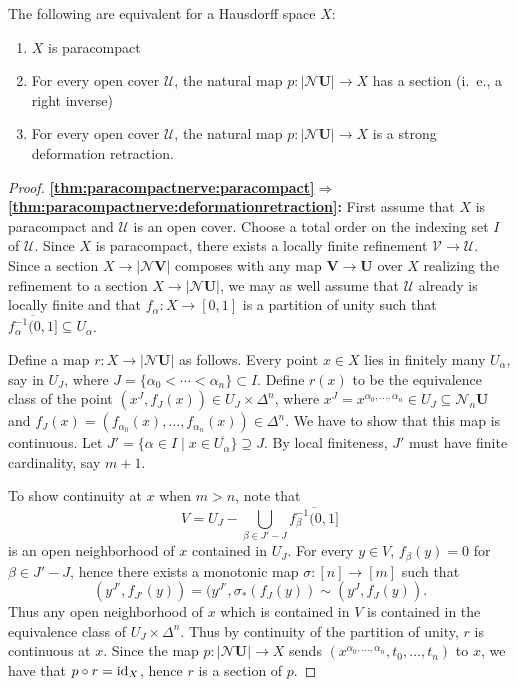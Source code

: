 \documentclass[a4paper,openany]{scrbook}
\newcommand{\nerve}{\mathcal N}
\begin{document}
\begin{thm}\label{thm:paracompactnerve}
The following are equivalent for a Hausdorff space $X$:
\begin{enumerate}
\item $X$ is paracompact\label{thm:paracompactnerve:paracompact}
\item For every open cover $\mathcal U$, the natural map $p\colon |\nerve \mathbf U| \to X$ has a section (i.~e., a right inverse)\label{thm:paracompactnerve:section}
\item For every open cover $\mathcal U$, the natural map $p\colon |\nerve \mathbf U| \to X$ is a strong deformation retraction.\label{thm:paracompactnerve:deformationretraction}
\end{enumerate}
\end{thm}
\begin{proof}
\noindent\textbf{\eqref{thm:paracompactnerve:paracompact}$\Longrightarrow$\eqref{thm:paracompactnerve:deformationretraction}:}
First assume that $X$ is paracompact and $\mathcal U$ is an open cover. Choose a total order on the indexing set $I$ of $\mathcal U$. Since $X$ is paracompact, there exists a locally finite refinement $\mathcal V \to \mathcal U$. Since a section $X \to |\nerve\mathbf V|$ composes with any map $\mathbf V \to \mathbf U$ over $X$ realizing the refinement to a section $X \to |\nerve\mathbf U|$,  we may as well assume that $\mathcal U$ already is locally finite and that $f_\alpha\colon X \to [0,1]$ is a partition of unity such that $\overline{f_\alpha^{-1}(0,1]} \subseteq U_\alpha$.

Define a map $r\colon X \to |\nerve\mathbf U|$ as follows. Every point $x \in X$ lies in finitely many $U_\alpha$, say in $U_J$, where $J=\{\alpha_0 < \cdots < \alpha_n\} \subset I$. Define $r(x)$ to be the equivalence class of the point $(x^J,f_J(x)) \in U_J \times \Delta^n$, where $x^J = x^{\alpha_0,\dots,\alpha_n} \in U_J \subseteq \nerve_n\mathbf U$ and $f_J(x)=(f_{\alpha_0}(x),\dots,f_{\alpha_n}(x)) \in \Delta^n$. We have to show that this map is continuous. Let $J' = \{\alpha \in I \mid x \in \overline{U_\alpha}\} \supseteq J$. By local finiteness, $J'$ must have finite cardinality, say $m+1$. 

To show continuity at $x$ when $m>n$, note that
\[
V = U_J - \bigcup_{\beta \in J'-J} \overline{f_\beta^{-1}(0,1]}
\]
is an open neighborhood of $x$ contained in $U_J$. For every $y \in V$, $f_{\beta}(y) = 0$ for $\beta \in J'-J$, hence there exists a monotonic map $\sigma\colon [n] \to [m]$ such that
\[
(y^{J'},f_{J'}(y)) = (y^{J'},\sigma_*(f_J(y)) \sim (y^J,f_J(y)).
\]
Thus any open neighborhood of $x$ which is contained in $V$ is contained in the equivalence class of $U_J \times \Delta^n$. Thus by continuity of the partition of unity, $r$ is continuous at $x$. Since the map $p\colon |\nerve \mathbf U| \to X$ sends $(x^{\alpha_0,\dots,\alpha_n},t_0,\dots,t_n)$ to $x$, we have that $p \circ r = \operatorname{id}_X$, hence $r$ is a section of $p$.


\end{proof}
\end{document}
